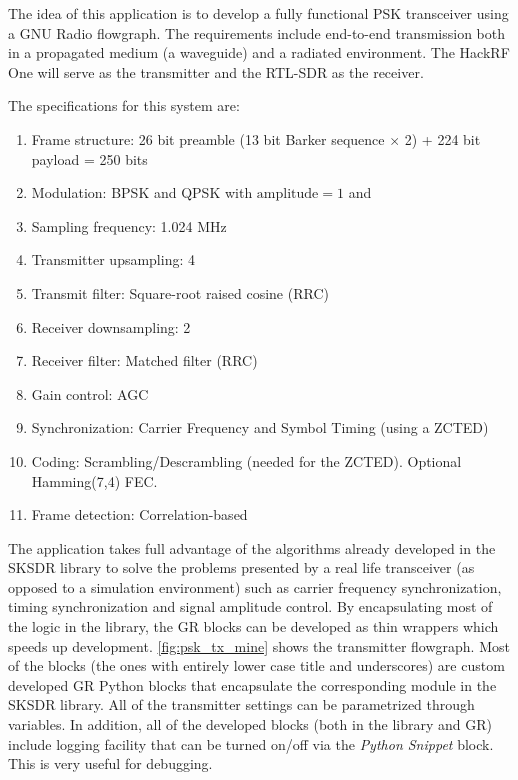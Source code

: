 The idea of this application is to develop a fully functional PSK transceiver using a GNU Radio flowgraph. The requirements include end-to-end transmission both in a propagated medium (a waveguide) and a radiated environment. The HackRF One will serve as the transmitter and the RTL-SDR as the receiver.

The specifications for this system are:
\begin{enumerate}
  \item Frame structure: 26 bit preamble (13 bit Barker sequence $\times$ 2) + 224 bit payload = 250 bits
  \item Modulation: BPSK and QPSK with $\text{amplitude}=1$ and
  \item Sampling frequency: 1.024 MHz
  \item Transmitter upsampling: 4
  \item Transmit filter: Square-root raised cosine (RRC)
  \item Receiver downsampling: 2
  \item Receiver filter: Matched filter (RRC)
  \item Gain control: AGC
  \item Synchronization: Carrier Frequency and Symbol Timing (using a ZCTED)
  \item Coding: Scrambling/Descrambling (needed for the ZCTED). Optional Hamming(7,4) FEC.
  \item Frame detection: Correlation-based
\end{enumerate}

The application takes full advantage of the algorithms already developed in the SKSDR library to solve the problems presented by a real life transceiver (as opposed to a simulation environment) such as carrier frequency synchronization, timing synchronization and signal amplitude control.
By encapsulating most of the logic in the library, the GR blocks can be developed as thin wrappers which speeds up development. \autoref{fig:psk_tx_mine} shows the transmitter flowgraph. Most of the blocks (the ones with entirely lower case title and underscores) are custom developed GR Python blocks that encapsulate the corresponding module in the SKSDR library. All of the transmitter settings can be parametrized through variables. In addition, all of the developed blocks (both in the library and GR) include logging facility that can be turned on/off via the \emph{Python Snippet} block. This is very useful for debugging.


